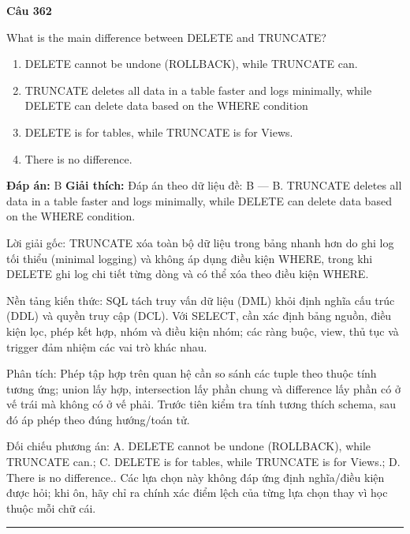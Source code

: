 \documentclass[11pt,a4paper]{article}
\newenvironment{question}[1]{%
  \par\vspace{1em}\noindent\textbf{\large Câu #1}\par\vspace{0.4em}
}{%
  \par\vspace{1em}\hrule\vspace{0.6em}
}
\newenvironment{choices}{%
  \begin{enumerate}[label=\textbf{\Alph*.},leftmargin=2.2em,itemsep=2pt,topsep=3pt]
}{%
  \end{enumerate}
}
\newcommand{\choice}{\item}
\begin{document}
\begin{question}{362}
What is the main difference between DELETE and TRUNCATE?
\begin{choices}
\choice DELETE cannot be undone (ROLLBACK), while TRUNCATE can.
\choice TRUNCATE deletes all data in a table faster and logs minimally, while DELETE can delete data based on the WHERE condition
\choice DELETE is for tables, while TRUNCATE is for Views.
\choice There is no difference.
\end{choices}
\textbf{Đáp án:} B
\textbf{Giải thích:} Đáp án theo dữ liệu đề: B — B. TRUNCATE deletes all data in a table faster and logs minimally, while DELETE can delete data based on the WHERE condition.

Lời giải gốc: TRUNCATE xóa toàn bộ dữ liệu trong bảng nhanh hơn do ghi log tối thiểu (minimal logging) và không áp dụng điều kiện WHERE, trong khi DELETE ghi log chi tiết từng dòng và có thể xóa theo điều kiện WHERE.

Nền tảng kiến thức: SQL tách truy vấn dữ liệu (DML) khỏi định nghĩa cấu trúc (DDL) và quyền truy cập (DCL). Với SELECT, cần xác định bảng nguồn, điều kiện lọc, phép kết hợp, nhóm và điều kiện nhóm; các ràng buộc, view, thủ tục và trigger đảm nhiệm các vai trò khác nhau.

Phân tích: Phép tập hợp trên quan hệ cần so sánh các tuple theo thuộc tính tương ứng; union lấy hợp, intersection lấy phần chung và difference lấy phần có ở vế trái mà không có ở vế phải. Trước tiên kiểm tra tính tương thích schema, sau đó áp phép theo đúng hướng/toán tử.

Đối chiếu phương án: A. DELETE cannot be undone (ROLLBACK), while TRUNCATE can.; C. DELETE is for tables, while TRUNCATE is for Views.; D. There is no difference.. Các lựa chọn này không đáp ứng định nghĩa/điều kiện được hỏi; khi ôn, hãy chỉ ra chính xác điểm lệch của từng lựa chọn thay vì học thuộc mỗi chữ cái.
\end{question}
\end{document}
